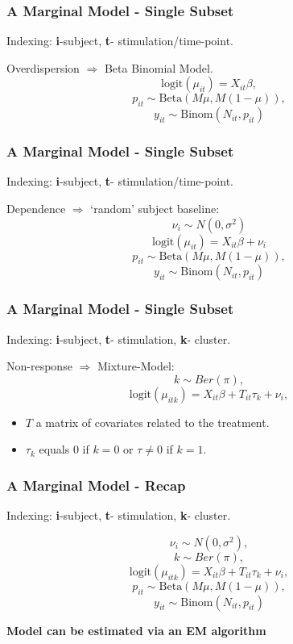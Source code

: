 \documentclass{beamer}
\theoremstyle{definition}
\begin{document}
\begin{frame}
\frametitle{A Marginal Model - Single Subset}
\begin{framed}
Indexing: \textbf{i}-subject, \textbf{t}- stimulation/time-point.
\end{framed}

Overdispersion $\Rightarrow$ Beta Binomial Model.
$$
\text{logit}(\mu_{it}) = X_{it} \beta,
$$$$
p_{it} \sim \text{Beta}(M\mu, M(1 - \mu)),
$$$$
y_{it} \sim \text{Binom}(N_{it}, p_{it})
$$
\end{frame}


\begin{frame}
\frametitle{A Marginal Model - Single Subset}
\begin{framed}
Indexing: \textbf{i}-subject, \textbf{t}- stimulation/time-point.
\end{framed}
Dependence $\Rightarrow$ `random' subject baseline:
$$
\nu_i \sim N(0, \sigma^{2})
$$$$
\text{logit}(\mu_{it}) = X_{it} \beta + \nu_i
$$$$
p_{it} \sim \text{Beta}(M\mu, M(1 - \mu)),
$$$$
y_{it} \sim \text{Binom}(N_{it}, p_{it})
$$

\end{frame}


\begin{frame}
\frametitle{A Marginal Model - Single Subset}
\begin{framed}
Indexing: \textbf{i}-subject, \textbf{t}- stimulation, \textbf{k}- cluster.
\end{framed}

Non-response $\Rightarrow$ Mixture-Model:
$$
k \sim Ber(\pi),
$$$$
\text{logit}(\mu_{itk}) = X_{it} \beta + T_{it}\tau_{k} + \nu_i,
$$
	\begin{itemize}
	\item $T$ a matrix of covariates related to the treatment.
	\item $\tau_k$ equals $0$ if $k=0$ or $\tau\neq0$ if $k = 1$.
	\end{itemize}
\end{frame}


\begin{frame}
\frametitle{A Marginal Model - Recap}
\begin{framed}
Indexing: \textbf{i}-subject, \textbf{t}- stimulation, \textbf{k}- cluster.
\end{framed}
$$
\nu_i \sim N(0, \sigma^{2}),
$$$$
k \sim Ber(\pi),
$$$$
\text{logit}(\mu_{itk}) = X_{it} \beta + T_{it}\tau_{k} + \nu_i,
$$$$
p_{it} \sim \text{Beta}(M\mu, M(1 - \mu)),
$$$$
y_{it} \sim \text{Binom}(N_{it}, p_{it})
$$

\vspace{0.3 cm}
\textbf{Model can be estimated via an EM algorithm}
\end{frame}
\end{document}

